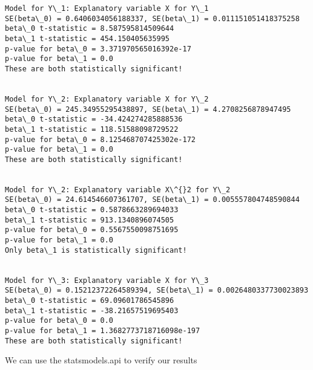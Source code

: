 \documentclass[11pt]{article}
\begin{document}
    \begin{Verbatim}[commandchars=\\\{\}]
Model for Y\_1: Explanatory variable X for Y\_1
SE(beta\_0) = 0.6406034056188337, SE(beta\_1) = 0.011151051418375258
beta\_0 t-statistic = 8.587595814509644
beta\_1 t-statistic = 454.150405635995
p-value for beta\_0 = 3.371970565016392e-17
p-value for beta\_1 = 0.0
These are both statistically significant!


Model for Y\_2: Explanatory variable X for Y\_2
SE(beta\_0) = 245.34955295438897, SE(beta\_1) = 4.2708256878947495
beta\_0 t-statistic = -34.424274285888536
beta\_1 t-statistic = 118.51588098729522
p-value for beta\_0 = 8.125468707425302e-172
p-value for beta\_1 = 0.0
These are both statistically significant!


Model for Y\_2: Explanatory variable X\^{}2 for Y\_2
SE(beta\_0) = 24.614546607361707, SE(beta\_1) = 0.005557804748590844
beta\_0 t-statistic = 0.5878663289694033
beta\_1 t-statistic = 913.1340896074505
p-value for beta\_0 = 0.5567550098751695
p-value for beta\_1 = 0.0
Only beta\_1 is statistically significant!


Model for Y\_3: Explanatory variable X for Y\_3
SE(beta\_0) = 0.15212372264589394, SE(beta\_1) = 0.0026480337730023893
beta\_0 t-statistic = 69.09601786545896
beta\_1 t-statistic = -38.21657519695403
p-value for beta\_0 = 0.0
p-value for beta\_1 = 1.3682773718716098e-197
These are both statistically significant!

    \end{Verbatim}

    We can use the statsmodels.api to verify our results
\end{document}
